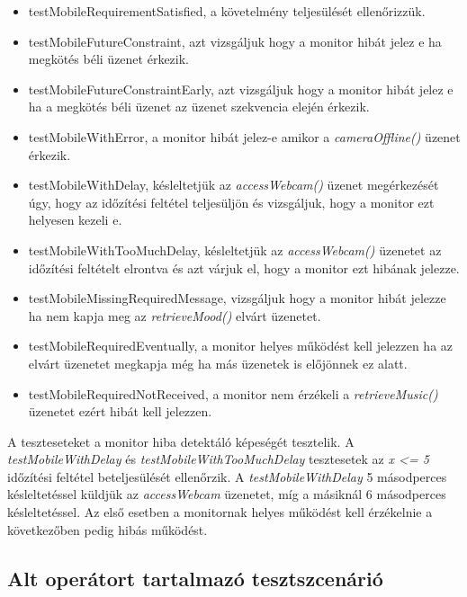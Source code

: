 \begin{itemize}
    \item testMobileRequirementSatisfied, a követelmény teljesülését ellenőrizzük.
    \item testMobileFutureConstraint, azt vizsgáljuk hogy a monitor hibát jelez e ha megkötés béli üzenet érkezik.
    \item testMobileFutureConstraintEarly, azt vizsgáljuk hogy a monitor hibát jelez e ha a megkötés béli üzenet az üzenet szekvencia elején érkezik.
    \item testMobileWithError, a monitor hibát jelez-e amikor a \textit{cameraOffline()} üzenet érkezik.
    \item testMobileWithDelay, késleltetjük az \textit{accessWebcam()} üzenet megérkezését úgy, hogy az időzítési feltétel teljesüljön és vizsgáljuk, hogy a monitor ezt helyesen kezeli e.
    \item testMobileWithTooMuchDelay, késleltetjük az \textit{accessWebcam()} üzenetet  az időzítési feltételt elrontva és azt várjuk el, hogy a monitor ezt hibának jelezze.
    \item testMobileMissingRequiredMessage, vizsgáljuk hogy a monitor hibát jelezze ha nem kapja meg az \textit{retrieveMood()} elvárt üzenetet.
    \item testMobileRequiredEventually, a monitor helyes működést kell jelezzen ha az elvárt üzenetet megkapja még ha más üzenetek is előjönnek ez alatt.
    \item testMobileRequiredNotReceived, a monitor nem érzékeli a \textit{retrieveMusic()} üzenetet ezért hibát kell jelezzen.
\end{itemize}

A teszteseteket a monitor hiba detektáló képeségét tesztelik.
A \textit{testMobileWithDelay} és \textit{testMobileWithTooMuchDelay} tesztesetek az \textit{x <= 5} időzítési feltétel beteljesülését ellenőrzik.
A \textit{testMobileWithDelay} 5 másodperces késleltetéssel küldjük az \textit{accessWebcam} üzenetet, míg a másiknál 6 másodperces késleltetéssel.
Az első esetben a monitornak helyes működést kell érzékelnie a következőben pedig hibás működést.

\subsection{Alt operátort tartalmazó tesztszcenárió}

